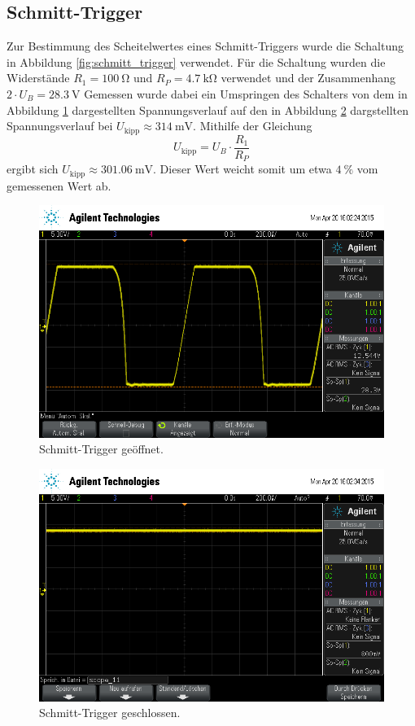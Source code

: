 \subsection{Schmitt-Trigger} %
\label{sub:schmitt_trigger}

Zur Bestimmung des Scheitelwertes eines Schmitt-Triggers wurde die Schaltung in Abbildung \ref{fig:schmitt_trigger} verwendet.
Für die Schaltung wurden die Widerstände $R_1 = \SI{100}{\ohm}$ und $R_P = \SI{4.7}{\kilo\ohm}$ verwendet und der Zusammenhang $2 \cdot U_B = \SI{28.3}{\volt}$
Gemessen wurde dabei ein Umspringen des Schalters von dem in Abbildung \ref{fig:schmitt_offen} dargestellten Spannungsverlauf auf den in Abbildung \ref{fig:schmitt_geschlossen} dargstellten Spannungsverlauf bei $U_\text{kipp} \approx \SI{314}{\milli\volt}$.
Mithilfe der Gleichung
\begin{equation*}
    U_\text{kipp} = U_B \cdot \frac{R_1}{R_P} 
\end{equation*}
ergibt sich $U_\text{kipp} \approx \SI{301.06}{\milli\volt}$.
Dieser Wert weicht somit um etwa $\SI{4}{\percent}$ vom gemessenen Wert ab.

\begin{figure}[!h]
    \centering
    \includegraphics[width=0.8\linewidth]{data/scope_10.png}
    \caption{Schmitt-Trigger geöffnet.}
    \label{fig:schmitt_offen}
\end{figure}

\begin{figure}[!h]
    \centering
    \includegraphics[width=0.8\linewidth]{data/scope_11.png}
    \caption{Schmitt-Trigger geschlossen.}
    \label{fig:schmitt_geschlossen}
\end{figure}

